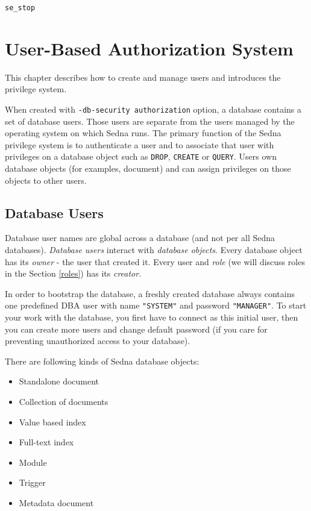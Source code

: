 \documentclass[a4paper,12pt]{article}
\newenvironment{citemize}
{\begin{itemize}
  \setlength{\itemsep}{0pt}
  \setlength{\parskip}{0pt}
  \setlength{\parsep}{0pt}}
{\end{itemize}}
\begin{document}
\begin{verbatim}
se_stop
\end{verbatim}

\section{User-Based Authorization System}

This chapter describes how to create and manage users and introduces the
privilege system.

When created with \verb!-db-security authorization! option, a database contains
a set of database users. Those users are separate from the users managed by the
operating system on which Sedna runs. The primary function of the Sedna
privilege system is to authenticate a user and to associate that user with
privileges on a database object such as \verb!DROP!, \verb!CREATE! or 
\verb!QUERY!. Users own database objects (for examples, document) and can
assign privileges on those objects to other users.


\subsection{Database Users}

Database user names are global across a database (and not per all Sedna
databases). \emph{Database users} interact with \emph{database objects}. Every
database object has its \emph{owner} - the user that created it. Every user and
\emph{role} (we will discuss roles in the Section \ref{roles}) has its
\emph{creator}.

In order to bootstrap the database, a freshly created database always contains
one predefined DBA user with name \verb!"SYSTEM"! and password \verb!"MANAGER"!.
To start your work with the database, you first have to connect as this initial
user, then you can create more users and change default password (if you care
for preventing unauthorized access to your database).

There are following kinds of Sedna database objects:
\begin{citemize}
\item Standalone document
\item Collection of documents
\item Value based index
\item Full-text index
\item Module
\item Trigger
\item Metadata document
\end{citemize}
\end{document}
